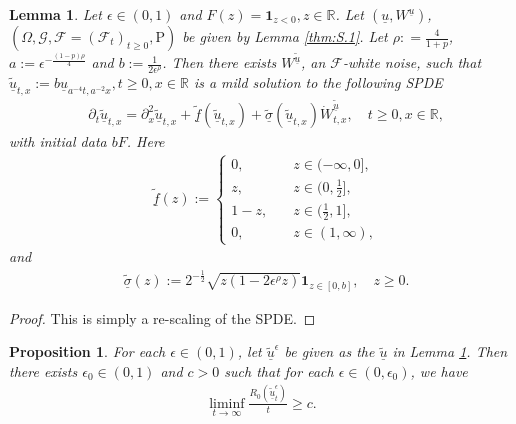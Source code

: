\documentclass[12pt,a4paper]{amsart}
\numberwithin{equation}{section}
\theoremstyle{plain}
\newtheorem{lemma}[theorem]{Lemma}
\newtheorem{proposition}[theorem]{Proposition}
\theoremstyle{remark}
\begin{document}
\begin{lemma} \label{thm:S.15}
	Let $\epsilon \in (0,1)$ and $F(z) = \mathbf 1_{z<0}, z\in \mathbb R$. Let $(\underline u, W^{\underline u})$, $(\Omega, \mathcal G, \mathcal F = (\mathcal F_t)_{t\geq 0}, \mathrm P)$ be given by Lemma \ref{thm:S.1}.
	Let $\rho : = \frac{4}{1+p}$, $a := \epsilon^{- \frac{(1-p)\rho}{4}}$ and $b := \frac{1}{2\epsilon^\rho}$.
	Then there exists $W^{\tilde {\underline u}}$, an $\mathcal F$-white noise, such that $\tilde {\underline u}_{t,x}:= b\underline u_{a^{-4}t,a^{-2}x}, t\geq 0, x\in \mathbb R$ is a mild solution to the following SPDE
\begin{align} 
	& \partial_{t} \tilde {\underline u}_{t,x} = \partial_x^2 \tilde {\underline u}_{t,x} + \tilde{\underline f}(\tilde {\underline u}_{t,x}) +  \tilde{\underline \sigma}(\tilde {\underline u}_{t,x}) \dot W_{t,x}^{\tilde{\underline u}}, \quad t\geq 0, x\in \mathbb R,
\end{align}
	with initial data $bF$. 
	Here 
\begin{align} 
& \tilde {\underline f}(z) :=
\begin{cases}
0, & \quad z\in (-\infty, 0],
\\z, & \quad z\in (0, \frac{1}{2}],
\\1- z, & \quad z\in (\frac{1}{2}, 1],
\\0, & \quad z\in (1, \infty),
\end{cases}  
\end{align}
and 
\begin{align} 
& \tilde {\underline\sigma}(z) :=  2^{-\frac{1}{2}} \sqrt{z(1 -  2\epsilon^\rho z)} \mathbf 1_{z\in [0,b]}, \quad z\geq 0.
\end{align}
\end{lemma} 
\begin{proof}
	\color{blue}
	This is simply a re-scaling of the SPDE.
\end{proof}

\begin{proposition}\label{thm:S.16}
	\color{red}
	For each $\epsilon \in (0,1)$, let $\tilde {\underline u}^\epsilon$ be given as the $\tilde {\underline u}$ in Lemma \ref{thm:S.15}. Then there exists $\epsilon_0 \in (0,1)$ and $c>0$ such that for each $\epsilon \in (0, \epsilon_0)$, we have
\begin{align}
	\liminf_{t\to \infty} \frac{R_0(\tilde {\underline u}^\epsilon_t)}{t} \geq c.
\end{align}
\end{proposition}
\end{document}
